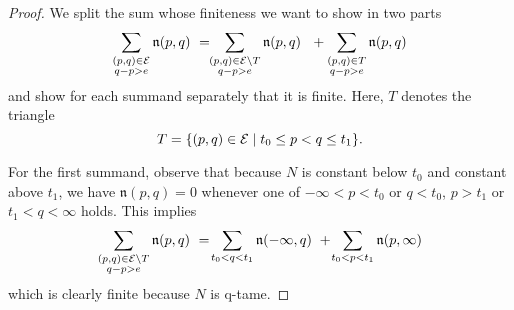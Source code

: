 \begin{proof}
    We split the sum whose finiteness we want to show in two parts
    \begin{equation*}
    \sum_{ \substack{ (p,q) \in \mathcal{E} \\ q-p > e } } \mathfrak{n} (p,q)
    \ = \!\!
    \sum_{ \substack{ (p,q) \in \mathcal{E} \setminus T \\ q-p > e } } \mathfrak{n} (p,q)
    \ \ +
    \sum_{ \substack{ (p,q) \in T \\ q-p > e } } \mathfrak{n} (p,q)
    \end{equation*}
    and show for each summand separately that it is finite.
    Here, $T$ denotes the triangle
    \begin{equation*}
    T = \{(p,q) \in \mathcal{E} \mid t_0 \leq p < q \leq t_1\}.
    \end{equation*}
    
    For the first summand, observe that because $N$ is constant below $t_0$ and constant above $t_1$, we have $\mathfrak{n}(p,q) = 0$ whenever one of $-\infty < p < t_0$ or $q < t_0$, $p > t_1$ or $t_1 < q < \infty$ holds.
    This implies 
    \begin{equation*}
    \sum_{ \substack{ (p,q) \in \mathcal{E} \setminus T \\ q-p > e } } \mathfrak{n} (p,q)
    \ = \!
    \sum_{t_0 < q < t_1} \mathfrak{n} (-\infty,q)
    \ + \!
    \sum_{t_0 < p < t_1} \mathfrak{n} (p, \infty)
    \end{equation*}
    which is clearly finite because $N$ is q-tame.
    

\end{proof}

